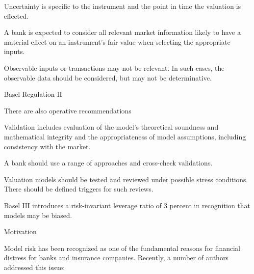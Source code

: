 	Uncertainty is specific to the instrument and the point in time the valuation is effected.

	A bank is expected to consider all relevant market information likely to have a material effect on an instrument's fair value when selecting the appropriate inputs.

	Observable inputs or transactions may not be relevant. In such cases, the observable data should be considered, but   may not be determinative.






{Basel Regulation II}






	There are also operative recommendations






	Validation includes evaluation of the model's theoretical soundness and mathematical integrity and the appropriateness of model assumptions, including consistency with the market.

	A bank should use a range of approaches and cross-check validations.

	Valuation models should be tested and reviewed under possible stress conditions. There should be defined triggers for such reviews.






Basel III introduces a risk-invariant leverage ratio of 3 percent in recognition that models may be biased.






{Motivation}






	Model risk has been recognized as one of the fundamental reasons for financial distress for banks and insurance companies.
Recently, a number of authors addressed this issue:






